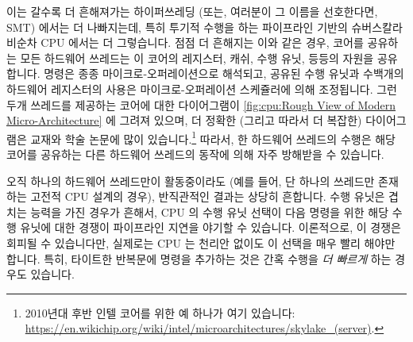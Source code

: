 이는 갈수록 더 흔해져가는 하이퍼쓰레딩 (또는, 여러분이 그 이름을 선호한다면,
SMT) 에서는 더 나빠지는데, 특히 투기적 수행을 하는 파이프라인 기반의 슈버스칼라
비순차 CPU 에서는 더 그렇습니다.
점점 더 흔해지는 이와 같은 경우, 코어를 공유하는 모든 하드웨어 쓰레드는 이
코어의 레지스터, 캐쉬, 수행 유닛, 등등의 자원을 공유합니다.
명령은 종종 마이크로-오퍼레이션으로 해석되고, 공유된 수행 유닛과 수백개의
하드웨어 레지스터의 사용은 마이크로-오퍼레이션 스케쥴러에 의해 조정됩니다.
그런 두개 쓰레드를 제공하는 코어에 대한 다이어그램이
\cref{fig:cpu:Rough View of Modern Micro-Architecture} 에 그려져 있으며, 더
정확한 (그리고 따라서 더 복잡한) 다이어그램은 교재와 학술 논문에 많이
있습니다.\footnote{
	2010년대 후반 인텔 코어를 위한 예 하나가 여기 있습니다:
	\url{https://en.wikichip.org/wiki/intel/microarchitectures/skylake_(server)}.}
따라서, 한 하드웨어 쓰레드의 수행은 해당 코어를 공유하는 다른 하드웨어 쓰레드의
동작에 의해 자주 방해받을 수 있습니다.

오직 하나의 하드웨어 쓰레드만이 활동중이라도 (예를 들어, 단 하나의 쓰레드만
존재하는 고전적 CPU 설계의 경우), 반직관적인 결과는 상당히 흔합니다.
수행 유닛은 겹치는 능력을 가진 경우가 흔해서, CPU 의 수행 유닛 선택이 다음
명령을 위한 해당 수행 유닛에 대한 경쟁이 파이프라인 지연을 야기할 수 있습니다.
이론적으로, 이 경쟁은 회피될 수 있습니다만, 실제로는 CPU 는 천리안 없이도 이
선택을 매우 빨리 해야만 합니다.
특히, 타이트한 반복문에 명령을 추가하는 것은 간혹 수행을 \emph{더 빠르게} 하는
경우도 있습니다.

